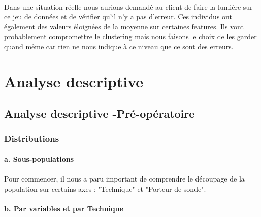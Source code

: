 \documentclass[11pt]{article}
\begin{document}
\paragraph{}
    
    Dans une situation réelle nous aurions demandé au client de faire la
lumière sur ce jeu de données et de vérifier qu'il n'y a pas d'erreur.
Ces individus ont également des valeurs éloignées de la moyenne sur
certaines features. Ils vont probablement compromettre le clustering
mais nous faisons le choix de les garder quand même car rien ne nous
indique à ce niveau que ce sont des erreurs.

    \section{Analyse descriptive}\label{analyse-descriptive}

    \subsection{Analyse descriptive -Pré-opératoire}\label{analyse-descriptive---pruxe9-opuxe9ratoire}

    \subsubsection{Distributions}\label{distributions}

    \paragraph{a. Sous-populations}\label{a.-sous-populations}
\paragraph{}
Pour commencer, il nous a paru important de comprendre le découpage de
la population sur certains axes : "Technique" et "Porteur de sonde".

    \begin{center}
    
    \end{center}

    \paragraph{b. Par variables et par Technique}\label{b.-par-variables-et-par-technique}
\end{document}
